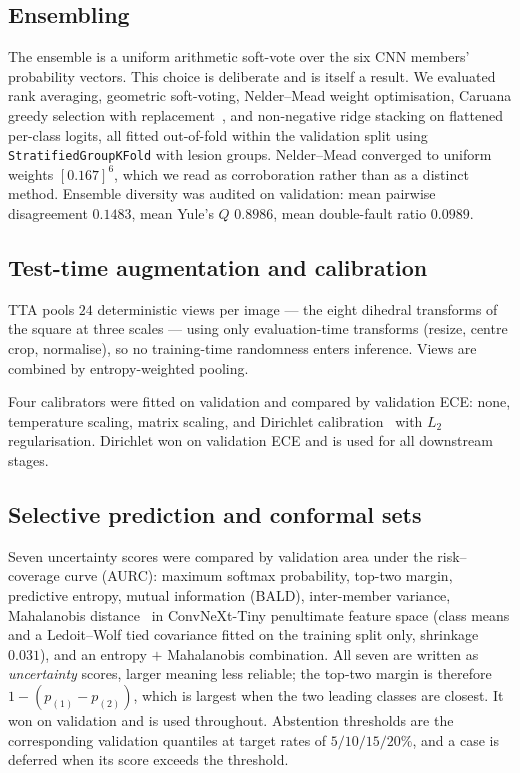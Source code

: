 \documentclass[journal]{IEEEtran}
\begin{document}
\subsection{Ensembling}
The ensemble is a uniform arithmetic soft-vote over the six CNN members' probability
vectors. This choice is deliberate and is itself a result. We evaluated rank averaging,
geometric soft-voting, Nelder--Mead weight optimisation, Caruana greedy selection with
replacement~\cite{caruana2004ensemble}, and non-negative ridge stacking on flattened
per-class logits, all fitted out-of-fold within the validation split using
\texttt{StratifiedGroupKFold} with lesion groups. Nelder--Mead converged to uniform weights
$[0.167]^6$, which we read as corroboration rather than as a distinct method. Ensemble
diversity was audited on validation: mean pairwise disagreement $0.1483$, mean Yule's $Q$
$0.8986$, mean double-fault ratio $0.0989$.

\subsection{Test-time augmentation and calibration}
TTA pools $24$ deterministic views per image --- the eight dihedral transforms of the square
at three scales --- using only evaluation-time transforms (resize, centre crop, normalise),
so no training-time randomness enters inference. Views are combined by entropy-weighted
pooling.

Four calibrators were fitted on validation and compared by validation ECE: none, temperature
scaling, matrix scaling, and Dirichlet calibration~\cite{kull2019dirichlet} with $L_2$
regularisation. Dirichlet won on validation ECE and is used for all downstream stages.

\subsection{Selective prediction and conformal sets}
Seven uncertainty scores were compared by validation area under the risk--coverage curve
(AURC): maximum softmax probability, top-two margin, predictive entropy, mutual information
(BALD), inter-member variance, Mahalanobis distance~\cite{lee2018mahalanobis} in
ConvNeXt-Tiny penultimate feature space (class means and a Ledoit--Wolf tied covariance
fitted on the training split only, shrinkage $0.031$), and an entropy $+$ Mahalanobis
combination. All seven are written as \emph{uncertainty} scores, larger meaning less
reliable; the top-two margin is therefore $1 - (p_{(1)} - p_{(2)})$, which is largest when
the two leading classes are closest. It won on validation and is used throughout. Abstention
thresholds are the corresponding validation quantiles at target rates of $5/10/15/20\%$, and
a case is deferred when its score exceeds the threshold.
\end{document}

